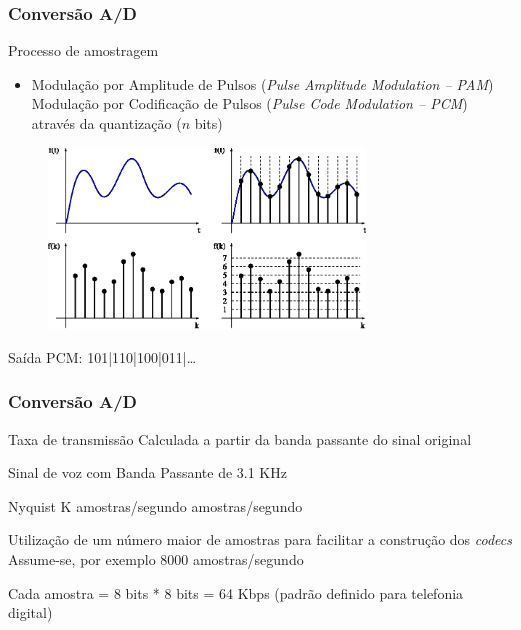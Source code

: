 \documentclass[xcolor]{beamer}
\begin{document}
\begin{frame}
    \frametitle{Conversão A/D}

    Processo de amostragem

    \begin{itemize}
        \item Modulação por Amplitude de Pulsos ({\it Pulse Amplitude Modulation
              -- PAM}) \implica Modulação por Codificação de Pulsos ({\it Pulse
              Code Modulation -- PCM}) através da quantização ($n$ bits)
    \end{itemize}

    \begin{figure}[htb]
    \centering
        \includegraphics[width=0.75\textwidth]{imgs/pcm}
    \end{figure}

    Saída PCM: 101|110|100|011|\ldots
\end{frame}

\begin{frame}
    \frametitle{Conversão A/D}

    Taxa de transmissão \implica Calculada a partir da banda passante do sinal
    original

    \vspace{0.25cm}

    \exemp
    {
        Sinal de voz com Banda Passante de 3.1 KHz

        \vspace{0.25cm}

        Nyquist  K amostras/segundo 
        amostras/segundo

        \vspace{0.25cm}

        Utilização de um número maior de amostras para facilitar a construção
        dos {\it codecs} \implica Assume-se, por exemplo 8000 amostras/segundo

        \vspace{0.25cm}

        Cada amostra = 8 bits  * 8 bits = 64 Kbps (padrão definido
        para telefonia digital)
    }
\end{frame}
\end{document}
